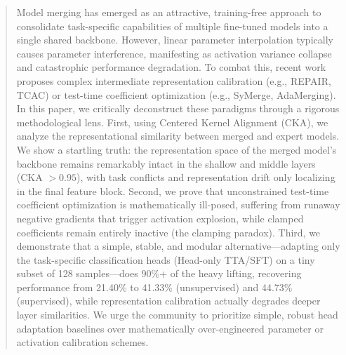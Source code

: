 \documentclass{article}
\theoremstyle{plain}
\theoremstyle{definition}
\theoremstyle{remark}
\begin{document}

\printAffiliationsAndNotice{}

\begin{abstract}
  Model merging has emerged as an attractive, training-free approach to consolidate task-specific capabilities of multiple fine-tuned models into a single shared backbone. However, linear parameter interpolation typically causes parameter interference, manifesting as activation variance collapse and catastrophic performance degradation. To combat this, recent work proposes complex intermediate representation calibration (e.g., REPAIR, TCAC) or test-time coefficient optimization (e.g., SyMerge, AdaMerging). In this paper, we critically deconstruct these paradigms through a rigorous methodological lens. First, using Centered Kernel Alignment (CKA), we analyze the representational similarity between merged and expert models. We show a startling truth: the representation space of the merged model's backbone remains remarkably intact in the shallow and middle layers (CKA $> 0.95$), with task conflicts and representation drift only localizing in the final feature block. Second, we prove that unconstrained test-time coefficient optimization is mathematically ill-posed, suffering from runaway negative gradients that trigger activation explosion, while clamped coefficients remain entirely inactive (the clamping paradox). Third, we demonstrate that a simple, stable, and modular alternative---adapting only the task-specific classification heads (Head-only TTA/SFT) on a tiny subset of 128 samples---does 90\%+ of the heavy lifting, recovering performance from 21.40\% to 41.33\% (unsupervised) and 44.73\% (supervised), while representation calibration actually degrades deeper layer similarities. We urge the community to prioritize simple, robust head adaptation baselines over mathematically over-engineered parameter or activation calibration schemes.
\end{abstract}
\end{document}
